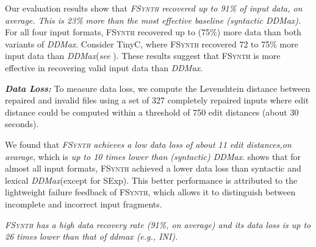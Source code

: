 \documentclass[sigconf,review,anonymous]{acmart}
\newenvironment{result}{\begin{framed}\centering\it}{\end{framed}}
\newcounter{todocounter}
\newcommand{\todo}[1]{\marginpar{$|$}\textcolor{red}{\stepcounter{todocounter}\footnote[\thetodocounter]{\textcolor{red}{\textbf{TODO }}\textit{#1}}}}
\newcommand{\recheck}[1]{\textcolor{red}{#1}}
\renewcommand{\todo}[1]{}
\newcommand{\approach}{\textsc{FSynth}\xspace}
\newcommand{\ddmax}{\textit{DDMax}\xspace}
\begin{document}
Our evaluation results show that \textit{\approach recovered up to 91\% of input data, on average. This is 23\% more than the most effective baseline (syntactic \ddmax).} For all four input formats, \approach recovered up to (75\%) more data than both variants of \ddmax. Consider TinyC, where \approach recovered 72 to 75\% more input data than \ddmax (\textit{see} ). These results suggest that \approach is more effective in recovering valid input data 
than \ddmax.

\noindent
\textbf{\textit{Data Loss:}} To measure data loss, we compute the Levenshtein distance between repaired and invalid files using %
a set of 327 completely repaired inputs %
where edit distance could be computed within a threshold of 750 edit distances (about 30 seconds).

We found that \textit{\approach achieves a low data loss of about 11 edit distances,on avarage},  which is \textit{up to 10 times lower than (syntactic) \ddmax}.  shows that 
for almost all input formats, \approach achieved a lower data loss than syntactic and lexical \ddmax (except for SExp). This better  performance is attributed to the lightweight failure feedback of \approach, which allows it to distinguish between incomplete and incorrect input fragments.

\begin{result}
\approach has a high data recovery rate (91\%, on average) and its data %
loss is up to 26 times lower than that of ddmax (e.g., INI).
\end{result}





%
%
\end{document}
